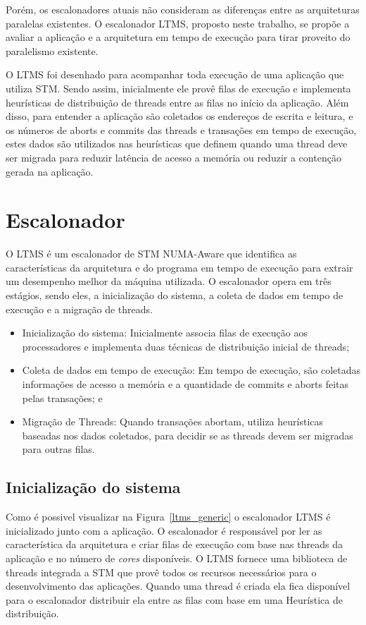 \documentclass[diss,capa]{texufpel}
\begin{document}
Porém, os escalonadores atuais não consideram as diferenças entre as arquiteturas paralelas existentes. O escalonador LTMS, proposto neste trabalho, se propõe a avaliar a aplicação e a arquitetura em tempo de execução para tirar proveito do paralelismo existente.

O LTMS foi desenhado para acompanhar toda execução de uma aplicação que utiliza STM. Sendo assim, inicialmente ele provê filas de execução e implementa heurísticas de distribuição de threads entre as filas no início da aplicação. Além disso, para entender a aplicação são coletados os endereços de escrita e leitura, e os números de aborts e commits das threads e transações em tempo de execução, estes dados são utilizados nas heurísticas que definem quando uma thread deve ser migrada para reduzir latência de acesso a memória ou reduzir a contenção gerada na aplicação.

\section{Escalonador}

O LTMS é um escalonador de STM NUMA-Aware que identifica as características da arquitetura e do programa em tempo de execução para extrair um desempenho melhor da máquina utilizada. O escalonador opera em três estágios, sendo eles, a inicialização do sistema, a coleta de dados em tempo de execução e a migração de threads.

\begin{itemize}
 \item Inicialização do sistema: Inicialmente associa filas de execução aos processadores e implementa duas técnicas de distribuição inicial de threads;
 \item Coleta de dados em tempo de execução: Em tempo de execução, são coletadas informações de acesso a memória e a quantidade de commits e aborts feitas pelas transações; e
 \item Migração de Threads: Quando transações abortam, utiliza heurísticas baseadas nos dados coletados, para decidir se as threads devem ser migradas para outras filas.
\end{itemize}

\subsection{Inicialização do sistema}
\label{inicializacao}

Como é possivel visualizar na Figura~\ref{ltms_generic} o escalonador LTMS é inicializado junto com a aplicação. O escalonador é responsável por ler as característica da arquitetura e criar filas de execução com base nas threads da aplicação e no número de \emph{cores} disponíveis. O LTMS fornece uma biblioteca de threads integrada a STM que provê todos os recursos necessários para o desenvolvimento das aplicações. Quando uma thread é criada ela fica disponível para o escalonador distribuir ela entre as filas com base em uma Heurística de distribuição.
\end{document}
